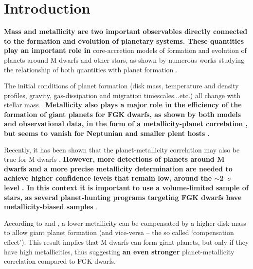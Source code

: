 \documentclass[structabstract]{aa}
\begin{document}
\section{Introduction}
\label{intro}

\textbf{Mass and metallicity are two important observables directly connected to the formation and evolution of planetary systems. These quantities play an important role in} core-accretion models of formation and evolution of planets around M dwarfs and other stars, as shown by numerous works studying the relationship of both quantities with planet formation \citep[e.g.][]{Ida-2005,Kornet-2006, Kennedy-2008a, Thommes-2008, Alibert-2011, Mordasini-2012}. 


The initial conditions of planet formation (disk mass, temperature and density profiles, gravity, gas-dissipation and migration timescales...etc.) all change with stellar mass \citep[e.g.][]{Ida-2005, Kornet-2006, Kennedy-2008a, Alibert-2011}.  \textbf{Metallicity also plays a major role in the efficiency of the formation of giant planets for FGK dwarfs, as shown by both models \citep[e.g.][]{Ida-2004b} and observational data, \textbf{in the form of a metallicity-planet correlation} \citep[e.g.][]{Gonzalez-1997,Santos-2004b,Fischer-2005, Sousa-2011b, Mayor-2011}, but seems to vanish for Neptunian and smaller plent hosts \citep[]{Sousa-2008,Bouchy-2009, Ghezzi-2010,Sousa-2011b}.}



Recently, it has been shown that the planet-metallicity correlation may also be true for M dwarfs \citep[e.g.][]{Bonfils-2007,Johnson-2009, Schlaufman-2010, Rojas-Ayala-2012, Terrien-2012}. \textbf{However, more detections of planets around M dwarfs and a more precise metallicity determination are needed to achieve higher confidence levels that remain low, around the $\sim$2~$\sigma$ level \citep{Bonfils-2007,Schlaufman-2010}. In this context it is important to use a volume-limited sample of stars, as several planet-hunting programs targeting FGK dwarfs have metallicity-biased samples \citep[e.g.][]{Baranne-1996,Fischer-2005b,Melo-2007} }.


According to \citet{Thommes-2008} and \citet{Mordasini-2012}, a lower metallicity can be compensated by a higher disk mass to allow giant planet formation (and vice-versa -- the so called `compensation effect'). This result implies that M dwarfs can form giant planets, but only if they have high metallicities, thus suggesting \textbf{an even stronger} planet-metallicity correlation compared to FGK dwarfs. 
\end{document}
